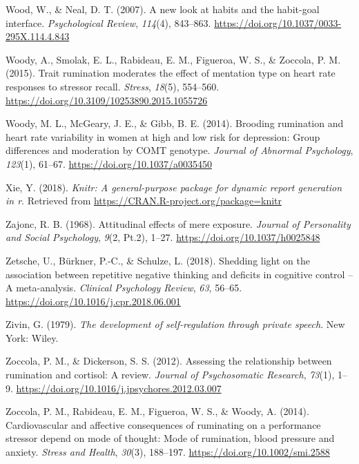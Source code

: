\documentclass[a4paper,12pt,twoside,onecolumn,openright,final,oldfontcommands]{memoir}
\begin{document}
\leavevmode\hypertarget{ref-wood_new_2007}{}%
Wood, W., \& Neal, D. T. (2007). A new look at habits and the habit-goal interface. \emph{Psychological Review}, \emph{114}(4), 843--863. \url{https://doi.org/10.1037/0033-295X.114.4.843}

\leavevmode\hypertarget{ref-woody_trait_2015}{}%
Woody, A., Smolak, E. L., Rabideau, E. M., Figueroa, W. S., \& Zoccola, P. M. (2015). Trait rumination moderates the effect of mentation type on heart rate responses to stressor recall. \emph{Stress}, \emph{18}(5), 554--560. \url{https://doi.org/10.3109/10253890.2015.1055726}

\leavevmode\hypertarget{ref-woody_brooding_2014}{}%
Woody, M. L., McGeary, J. E., \& Gibb, B. E. (2014). Brooding rumination and heart rate variability in women at high and low risk for depression: Group differences and moderation by COMT genotype. \emph{Journal of Abnormal Psychology}, \emph{123}(1), 61--67. \url{https://doi.org/10.1037/a0035450}

\leavevmode\hypertarget{ref-R-knitr}{}%
Xie, Y. (2018). \emph{Knitr: A general-purpose package for dynamic report generation in r}. Retrieved from \url{https://CRAN.R-project.org/package=knitr}

\leavevmode\hypertarget{ref-zajonc_attitudinal_1968}{}%
Zajonc, R. B. (1968). Attitudinal effects of mere exposure. \emph{Journal of Personality and Social Psychology}, \emph{9}(2, Pt.2), 1--27. \url{https://doi.org/10.1037/h0025848}

\leavevmode\hypertarget{ref-zetsche_shedding_2018}{}%
Zetsche, U., Bürkner, P.-C., \& Schulze, L. (2018). Shedding light on the association between repetitive negative thinking and deficits in cognitive control -- A meta-analysis. \emph{Clinical Psychology Review}, \emph{63}, 56--65. \url{https://doi.org/10.1016/j.cpr.2018.06.001}

\leavevmode\hypertarget{ref-zivin_development_1979}{}%
Zivin, G. (1979). \emph{The development of self-regulation through private speech}. New York: Wiley.

\leavevmode\hypertarget{ref-zoccola_assessing_2012}{}%
Zoccola, P. M., \& Dickerson, S. S. (2012). Assessing the relationship between rumination and cortisol: A review. \emph{Journal of Psychosomatic Research}, \emph{73}(1), 1--9. \url{https://doi.org/10.1016/j.jpsychores.2012.03.007}

\leavevmode\hypertarget{ref-zoccola_cardiovascular_2014}{}%
Zoccola, P. M., Rabideau, E. M., Figueroa, W. S., \& Woody, A. (2014). Cardiovascular and affective consequences of ruminating on a performance stressor depend on mode of thought: Mode of rumination, blood pressure and anxiety. \emph{Stress and Health}, \emph{30}(3), 188--197. \url{https://doi.org/10.1002/smi.2588}
\end{document}
